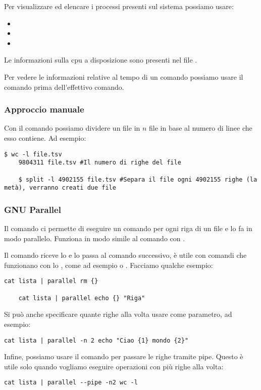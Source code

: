 \documentclass[../main.tex]{subfiles}
\begin{document}
Per visualizzare ed elencare i processi presenti sul sistema possiamo usare:
\begin{itemize}
    \item {}
    \item {}
    \item {}
\end{itemize}

\vspace{1cm}
Le informazioni sulla cpu a disposizione sono presenti nel file .

\vspace{1cm}
Per vedere le informazioni relative al tempo di un comando possiamo usare il comando  prima dell'effettivo comando.

\vspace{1cm}
\subsubsection{Approccio manuale}
Con il comando  possiamo dividere un file in $n$ file in base al numero di linee che esso contiene. Ad esempio:
\begin{lstlisting}[style=bash]
    $ wc -l file.tsv
    9804311 file.tsv #Il numero di righe del file
    
    $ split -l 4902155 file.tsv #Separa il file ogni 4902155 righe (la metà), verranno creati due file
\end{lstlisting}

\subsubsection{GNU Parallel}
Il comando  ci permette di eseguire un comando per ogni riga di un file e lo fa in modo parallelo. Funziona in modo simile
al comando  con .

Il comando  riceve lo  e lo passa al comando successivo, è utile con comandi che funzionano con lo ,
come ad esempio  o . Facciamo qualche esempio:
\begin{lstlisting}[style=bash]
    cat lista | parallel rm {}

    cat lista | parallel echo {} "Riga"
\end{lstlisting}

\vspace{1cm}
Si può anche specificare quante righe alla volta usare come parametro, ad esempio:
\begin{lstlisting}[style=bash]
    cat lista | parallel -n 2 echo "Ciao {1} mondo {2}"
\end{lstlisting}

\vspace{1cm}
Infine, possiamo usare il comando  per passare le righe tramite pipe. Questo è utile solo quando vogliamo eseguire operazioni
con più righe alla volta:
\begin{lstlisting}[style=bash]
    cat lista | parallel --pipe -n2 wc -l
\end{lstlisting}
\end{document}
